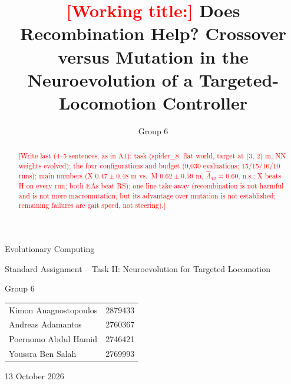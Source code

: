\documentclass[sigconf,nonacm]{acmart}
\newcommand{\groupnumber}{6}
\newcommand{\todo}[1]{\textcolor{red}{[#1]}}
\newcommand{\cfgM}{\textsf{M}}     %
\newcommand{\cfgX}{\textsf{X}}     %
\newcommand{\cfgH}{\textsf{H}}    %
\begin{document}
\onecolumn
\thispagestyle{empty}
\begin{center}
  \vspace*{0.2\textheight}
  {\LARGE Evolutionary Computing\par}
  \vspace{1.5em}
  {\Large Standard Assignment -- Task II: Neuroevolution for Targeted Locomotion\par}
  \vspace{2.5em}
  {\large Group \groupnumber\par}
  \vspace{1.5em}
  \begin{tabular}{ll}
    Kimon Anagnostopoulos & 2879433 \\
    Andreas Adamantos & 2760367 \\
    Poernomo Abdul Hamid & 2746421 \\
    Youssra Ben Salah & 2769993 \\
  \end{tabular}
  \par\vfill
  {\large 13 October 2026\par}
\end{center}
\clearpage
\setcounter{page}{1}

\title{\todo{Working title:} Does Recombination Help? Crossover versus Mutation in the Neuroevolution of a Targeted-Locomotion Controller}
\author{Group \groupnumber}

\begin{abstract}
\todo{Write last (4--5 sentences, as in A1): task (spider\_8, flat world, target at (3, 2) m, NN weights evolved); the four configurations and budget (9{,}030 evaluations; 15/15/10/10 runs); main numbers (\cfgX{} $0.47 \pm 0.48$ m vs.\ \cfgM{} $0.62 \pm 0.59$ m, $\hat{A}_{12} = 0.60$, n.s.; \cfgX{} beats \cfgH{} on every run; both EAs beat RS); one-line take-away (recombination is not harmful and is not mere macromutation, but its advantage over mutation is not established; remaining failures are gait speed, not steering).}
\end{abstract}

\maketitle
\end{document}
